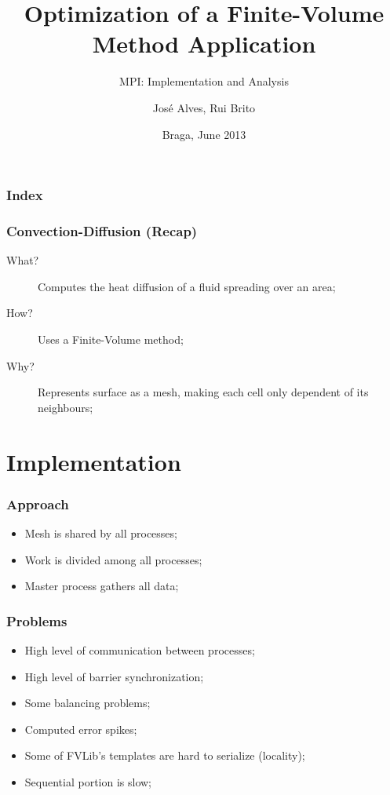 \documentclass{beamer}
\title{Optimization of a Finite-Volume Method Application}
\subtitle{MPI: Implementation and Analysis}
\author{José Alves, Rui Brito}
\institute[22765, 22781]{
	Universidade do Minho
}
\date{Braga, June 2013}
\begin{document}

\maketitle%

\begin{frame}
	\frametitle{Index}
	\tableofcontents
\end{frame}

\begin{frame}
	\frametitle{Convection-Diffusion (Recap)}
	\begin{description}
		\item [What?] Computes the heat diffusion of a fluid spreading over an area;
		\item [How?] Uses a Finite-Volume method;
		\item [Why?] Represents surface as a mesh, making each cell only dependent of its neighbours;
	\end{description}
\end{frame}

\section{Implementation}

\begin{frame}
	\frametitle{Approach}
	\begin{itemize}
		\item Mesh is shared by all processes;
		\item Work is divided among all processes;
		\item Master process gathers all data;		
	\end{itemize}
\end{frame}


\begin{frame}
	\frametitle{Problems}
	\begin{itemize}		
		\item High level of communication between processes;
		\item High level of barrier synchronization;
		\item Some balancing problems;
		\item Computed error spikes;
		\item Some of FVLib's templates are hard to serialize (locality);
		\item Sequential portion is slow;
	\end{itemize}
\end{frame}
\end{document}
